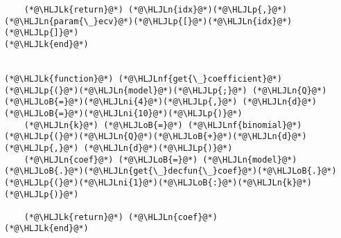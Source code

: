 \documentclass[12pt,a4paper]{article}
\newcommand{\HLJLk}[1]{\textcolor[RGB]{148,91,176}{\textbf{#1}}}
\newcommand{\HLJLn}[1]{#1}
\newcommand{\HLJLnf}[1]{\textcolor[RGB]{66,102,213}{#1}}
\newcommand{\HLJLni}[1]{\textcolor[RGB]{59,151,46}{#1}}
\newcommand{\HLJLoB}[1]{\textcolor[RGB]{102,102,102}{\textbf{#1}}}
\newcommand{\HLJLp}[1]{#1}
\begin{document}
\begin{lstlisting}
    (*@\HLJLk{return}@*) (*@\HLJLn{idx}@*)(*@\HLJLp{,}@*) (*@\HLJLn{param{\_}ecv}@*)(*@\HLJLp{[}@*)(*@\HLJLn{idx}@*)(*@\HLJLp{]}@*)
(*@\HLJLk{end}@*)


(*@\HLJLk{function}@*) (*@\HLJLnf{get{\_}coefficient}@*)(*@\HLJLp{(}@*)(*@\HLJLn{model}@*)(*@\HLJLp{;}@*) (*@\HLJLn{Q}@*)(*@\HLJLoB{=}@*)(*@\HLJLni{4}@*)(*@\HLJLp{,}@*) (*@\HLJLn{d}@*)(*@\HLJLoB{=}@*)(*@\HLJLni{10}@*)(*@\HLJLp{)}@*)
    (*@\HLJLn{k}@*) (*@\HLJLoB{=}@*) (*@\HLJLnf{binomial}@*)(*@\HLJLp{(}@*)(*@\HLJLn{Q}@*)(*@\HLJLoB{+}@*)(*@\HLJLn{d}@*)(*@\HLJLp{,}@*) (*@\HLJLn{d}@*)(*@\HLJLp{)}@*)
    (*@\HLJLn{coef}@*) (*@\HLJLoB{=}@*) (*@\HLJLn{model}@*)(*@\HLJLoB{.}@*)(*@\HLJLn{get{\_}decfun{\_}coef}@*)(*@\HLJLoB{.}@*)(*@\HLJLp{(}@*)(*@\HLJLni{1}@*)(*@\HLJLoB{:}@*)(*@\HLJLn{k}@*)(*@\HLJLp{)}@*)

    (*@\HLJLk{return}@*) (*@\HLJLn{coef}@*)
(*@\HLJLk{end}@*)
\end{lstlisting}
\end{document}
